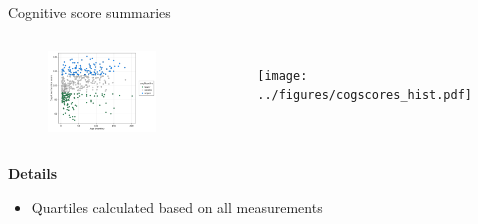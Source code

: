 
\begin{frame}{Cognitive score summaries}
    \begin{columns}[c] %

        
        \begin{figure}
            \includegraphics[width=1\linewidth]{../figures/cogScore_quartiles.png}
        \end{figure}

    
        \begin{figure}
        \texttt{[image: ../figures/cogscores\_hist.pdf]}
        \end{figure}

    \end{columns}

    \textbf{Details}
    \begin{itemize}
        \item Quartiles calculated based on all measurements
    \end{itemize}

\end{frame}

